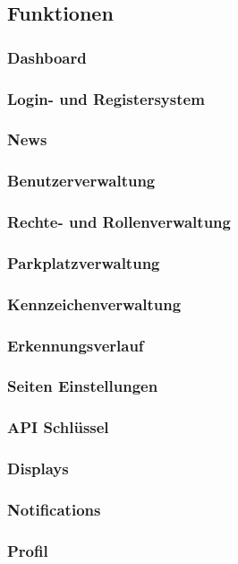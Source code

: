 \subsection{Funktionen}
\subsubsection{Dashboard}
\subsubsection{Login- und Registersystem}
\subsubsection{News}
\subsubsection{Benutzerverwaltung}
\subsubsection{Rechte- und Rollenverwaltung}
\subsubsection{Parkplatzverwaltung}
\subsubsection{Kennzeichenverwaltung}
\subsubsection{Erkennungsverlauf}
\subsubsection{Seiten Einstellungen}
\subsubsection{API Schlüssel}
\subsubsection{Displays}
\subsubsection{Notifications}
\subsubsection{Profil}

